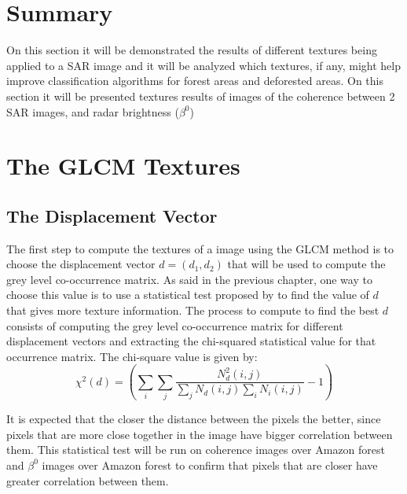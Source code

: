 
\section*{Summary}
On this section it will be demonstrated the results of different textures being applied to a SAR image and it will be analyzed which textures, if any, might help improve classification algorithms for forest areas and deforested areas. On this section it will be presented textures results of images of the coherence between 2 SAR images, and radar brightness ($\beta^0$)

\section{The GLCM Textures} 
\label{sec:gv1}

\subsection{The Displacement Vector}
\label{subsec:displacement_vector}
The first step to compute the textures of a image using the GLCM method is to choose the displacement vector $d=(d_1, d_2)$ that will be used to compute the grey level co-occurrence matrix. As said in the previous chapter, one way to choose this value is to use a statistical test proposed by \cite{Zucker} to find the value of $d$ that gives more texture information.
The process to compute to find the best $d$ consists of computing the grey level co-occurrence matrix for different displacement vectors and extracting the chi-squared statistical value for that occurrence matrix. The chi-square value is given by:
\begin{equation}
    \label{eq:test}
    \chi^2(d) = (\sum_i\sum_j \frac{N_d^2(i,j)}{\sum_jN_d(i,j)\sum_iN_i(i,j)} -1)
\end{equation}

It is expected that the closer the distance between the pixels the better, since pixels that are more close together in the image have bigger correlation between them. This statistical test will be run on coherence images over Amazon forest and $\beta^0$ images over Amazon forest to confirm that pixels that are closer have greater correlation between them.  
%     
%     

